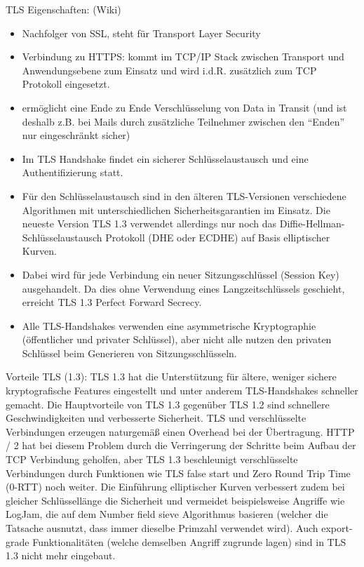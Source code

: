 \documentclass[notitlepage, hidelinks]{article}
\begin{document}
TLS Eigenschaften: (Wiki)
\begin{itemize}
\item Nachfolger von SSL, steht für Transport Layer Security
\item Verbindung zu HTTPS: kommt im TCP/IP Stack zwischen Transport und Anwendungsebene zum Einsatz und wird i.d.R. zusätzlich zum TCP Protokoll eingesetzt. 
\item ermöglicht eine Ende zu Ende Verschlüsselung von Data in Transit (und ist deshalb z.B. bei Mails durch zusätzliche Teilnehmer zwischen den ``Enden'' nur eingeschränkt sicher)
\item Im TLS Handshake findet ein sicherer Schlüsselaustausch und eine Authentifizierung statt.
\item Für den Schlüsselaustausch sind in den älteren TLS-Versionen verschiedene Algorithmen mit unterschiedlichen Sicherheitsgarantien im Einsatz. Die neueste Version TLS 1.3 verwendet allerdings nur noch das Diffie-Hellman-Schlüsselaustausch Protokoll (DHE oder ECDHE) auf Basis elliptischer Kurven.
\item Dabei wird für jede Verbindung ein neuer Sitzungsschlüssel (Session Key) ausgehandelt. Da dies ohne Verwendung eines Langzeitschlüssels geschieht, erreicht TLS 1.3 Perfect Forward Secrecy.
\item Alle TLS-Handshakes verwenden eine asymmetrische Kryptographie (öffentlicher und privater Schlüssel), aber nicht alle nutzen den privaten Schlüssel beim Generieren von Sitzungsschlüsseln.
\end{itemize}

Vorteile TLS (1.3):
TLS 1.3 hat die Unterstützung für ältere, weniger sichere kryptografische Features eingestellt und unter anderem TLS-Handshakes schneller gemacht. Die Hauptvorteile von TLS 1.3 gegenüber TLS 1.2 sind schnellere Geschwindigkeiten und verbesserte Sicherheit. TLS und verschlüsselte Verbindungen erzeugen naturgemäß einen Overhead bei der Übertragung. HTTP / 2 hat bei diesem Problem durch die Verringerung der Schritte beim Aufbau der TCP Verbindung geholfen, aber TLS 1.3 beschleunigt verschlüsselte Verbindungen durch Funktionen wie TLS false start und Zero Round Trip Time (0-RTT) noch weiter. Die Einführung elliptischer Kurven verbessert zudem bei gleicher Schlüssellänge die Sicherheit und vermeidet beispielsweise Angriffe wie LogJam, die auf dem Number field sieve Algorithmus basieren (welcher die Tatsache ausnutzt, dass immer dieselbe Primzahl verwendet wird). Auch export-grade Funktionalitäten (welche demselben Angriff zugrunde lagen) sind in TLS 1.3 nicht mehr eingebaut.
\end{document}
